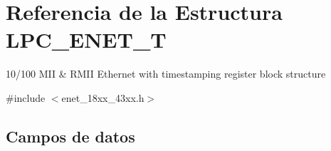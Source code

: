 \hypertarget{struct_l_p_c___e_n_e_t___t}{}\section{Referencia de la Estructura L\+P\+C\+\_\+\+E\+N\+E\+T\+\_\+T}
\label{struct_l_p_c___e_n_e_t___t}


10/100 M\+II \& R\+M\+II Ethernet with timestamping register block structure  




{\ttfamily \#include $<$enet\+\_\+18xx\+\_\+43xx.\+h$>$}

\subsection*{Campos de datos}
